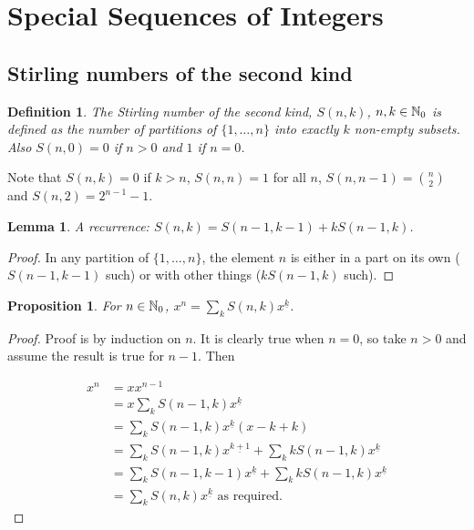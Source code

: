 \documentclass{notes}
\theoremstyle{plain}
\newtheorem*{definition}{Definition}
\newtheorem{lemma}{Lemma}[chapter]
\newtheorem*{proposition}{Proposition}
\begin{document}
\section{Special Sequences of Integers}

\subsection{Stirling numbers of the second kind}

\begin{definition}
The Stirling number of the second kind, $S(n,k)$, $n,k \in \mathbb{N}_0$ is
defined as the number of partitions of $\{1,\dots, n\}$ into exactly
$k$ non-empty subsets.  Also $S(n,0)=0$ if $n > 0$ and $1$ if $n=0$.
\end{definition}

Note that $S(n,k) = 0$ if $k > n$, $S(n,n) = 1$ for all $n$, $S(n,n-1)
= \binom{n}{2}$ and $S(n,2) = 2^{n-1} - 1$.

\begin{lemma}
A recurrence: $S(n,k) = S(n-1,k-1) + k S(n-1,k)$.
\end{lemma}

\begin{proof}
In any partition of $\{1,\dots, n \}$, the element $n$ is either
in a part on its own ($S(n-1,k-1)$ such) or with other things ($k S(n-1,k)$
such).
\end{proof}

\begin{proposition}
For $n \in \mathbb{N}_0$, $x^n = \sum_k S(n,k) x^{\underline{k}}$.
\end{proposition}

\begin{proof}
Proof is by induction on $n$.  It is clearly true when $n=0$, so take
$n > 0$ and assume the result is true for $n-1$.  Then

\begin{align*}
x^n & = x x^{n-1} \\
&= x \sum_k S(n-1,k) x^{\underline{k}} \\
&= \sum_k S(n-1,k) x^{\underline{k}} (x - k + k) \\
&= \sum_k S(n-1,k) x^{\underline{k+1}} + \sum_k k S(n-1,k) x^{\underline{k}} \\
&= \sum_k S(n-1,k-1) x^{\underline{k}} + \sum_k k S(n-1,k) x^{\underline{k}} \\
&= \sum_k S(n,k) x^{\underline{k}} \text{ as required.}
\end{align*}
\end{proof}
\end{document}
